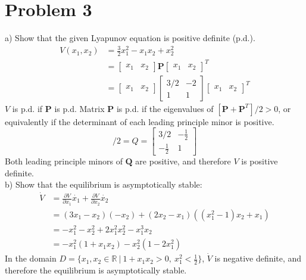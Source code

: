 \documentclass[paper=a4, fontsize=11pt]{scrartcl} %
\numberwithin{equation}{section} %
\numberwithin{figure}{section} %
\numberwithin{table}{section} %
\begin{document}
\section{Problem 3}
a) Show that the given Lyapunov equation is positive definite (p.d.).
\begin{align}
V(x_1, x_2) &= \frac{3}{2} x_1^2-x_1x_2+x_2^2 \\
&= \begin{bmatrix}x_1 & x_2\end{bmatrix} \mathbf{P} \begin{bmatrix}x_1 & x_2\end{bmatrix}^T \\
&= \begin{bmatrix}x_1 & x_2\end{bmatrix} \begin{bmatrix}3/2 & -2\\ 1 & 1\end{bmatrix} \begin{bmatrix}x_1 & x_2\end{bmatrix}^T
\end{align}
$V$ is p.d. if $\mathbf{P}$ is p.d. Matrix $\mathbf{P}$ is p.d. if the eigenvalues of $[\mathbf{P}+\mathbf{P}^T]/2>0$, or equivalently if the determinant of each leading principle minor is positive.
\begin{equation}
[P+P^T]/2 = Q = \begin{bmatrix}3/2 & -\frac{1}{2}\\ -\frac{1}{2} & 1\end{bmatrix}
\end{equation}
Both leading principle minors of $\mathbf{Q}$ are positive, and therefore $V$ is positive definite. \\

b) Show that the equilibrium is asymptotically stable:
\begin{align}
\dot{V} &= \frac{\partial V}{\partial x_1}\dot{x_1} + \frac{\partial V}{\partial x_2}\dot{x_2} \\
&= (3x_1-x_2)(-x_2) + (2x_2-x_1)((x_1^2-1)x_2+x_1) \\
&= -x_1^2-x_2^2 + 2x_1^2x_2^2-x_1^3x_2 \\
&= -x_1^2(1+x_1x_2) - x_2^2(1-2x_1^2)
\end{align}
In the domain $D=\{x_1, x_2 \in \mathbb{R}\ |\ 1+x_1x_2>0,\ x_1^2<\frac{1}{2}\}$, $\dot{V}$ is negative definite, and therefore the equilibrium is asymptotically stable. \\
\end{document}
